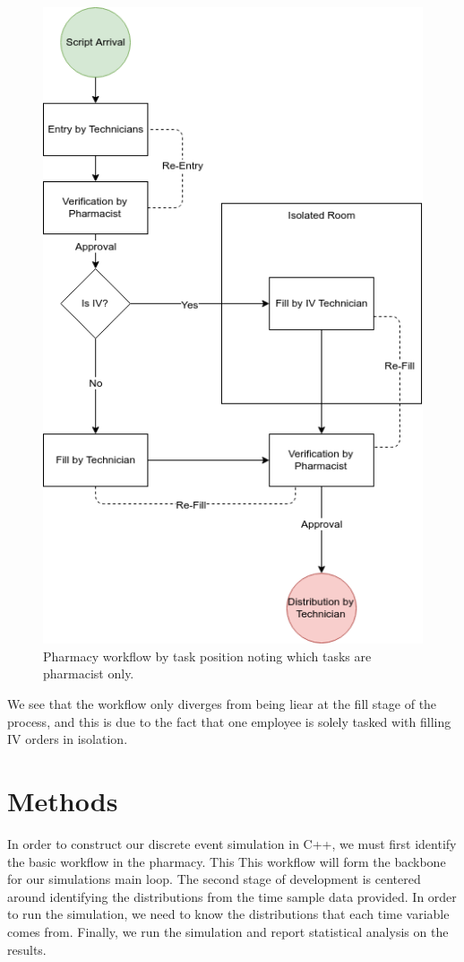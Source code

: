 \documentclass[10pt]{report}            %
\begin{document}
\begin{figure}[h]
\centering
\includegraphics[scale=.5]{Flowchart.png}
\caption{Pharmacy workflow by task position noting which tasks are pharmacist only.}
\label{fig:flowchart}
\end{figure}
We see that the workflow only diverges from being liear at the fill stage of the process, and this is due to the fact that one employee is solely tasked with filling IV orders in isolation.
\section*{Methods}
In order to construct our discrete event simulation in C++, we must first identify the basic workflow in the pharmacy. This  This workflow will form the backbone for our simulations main loop. The second stage of development is centered around identifying the distributions from the time sample data provided. In order to run the simulation, we need to know the distributions that each time variable comes from. Finally, we run the simulation and report statistical analysis on the results.
\end{document}
